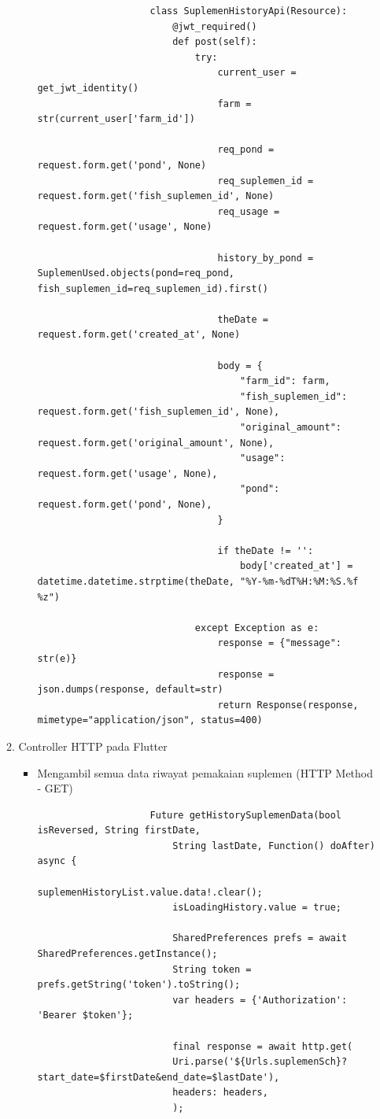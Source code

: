 \begin{spacing}{1.5}
\begin{enumerate}
\begin{enumerate}
\begin{itemize}
				\begin{lstlisting}
					class SuplemenHistoryApi(Resource):
						@jwt_required()
						def post(self):
							try:
								current_user = get_jwt_identity()
								farm = str(current_user['farm_id'])
					
								req_pond = request.form.get('pond', None)
								req_suplemen_id = request.form.get('fish_suplemen_id', None)
								req_usage = request.form.get('usage', None) 
								
								history_by_pond =  SuplemenUsed.objects(pond=req_pond, fish_suplemen_id=req_suplemen_id).first()
					
								theDate = request.form.get('created_at', None)
					
								body = {
									"farm_id": farm,
									"fish_suplemen_id": request.form.get('fish_suplemen_id', None),
									"original_amount": request.form.get('original_amount', None),
									"usage": request.form.get('usage', None),
									"pond": request.form.get('pond', None),
								}
					
								if theDate != '':
									body['created_at'] = datetime.datetime.strptime(theDate, "%Y-%m-%dT%H:%M:%S.%f %z") 

							except Exception as e:
								response = {"message": str(e)}
								response = json.dumps(response, default=str)
								return Response(response, mimetype="application/json", status=400)
				\end{lstlisting}
			\end{itemize}

			\item Controller HTTP pada Flutter
			
			\begin{itemize}
				\item Mengambil semua data riwayat pemakaian suplemen (HTTP Method - GET)
				
				\begin{lstlisting}
					Future getHistorySuplemenData(bool isReversed, String firstDate,
						String lastDate, Function() doAfter) async {
						suplemenHistoryList.value.data!.clear();
						isLoadingHistory.value = true;

						SharedPreferences prefs = await SharedPreferences.getInstance();
						String token = prefs.getString('token').toString();
						var headers = {'Authorization': 'Bearer $token'};

						final response = await http.get(
						Uri.parse('${Urls.suplemenSch}?start_date=$firstDate&end_date=$lastDate'),
						headers: headers,
						);


\end{lstlisting}
\end{itemize}
\end{enumerate}
\end{enumerate}
\end{spacing}
